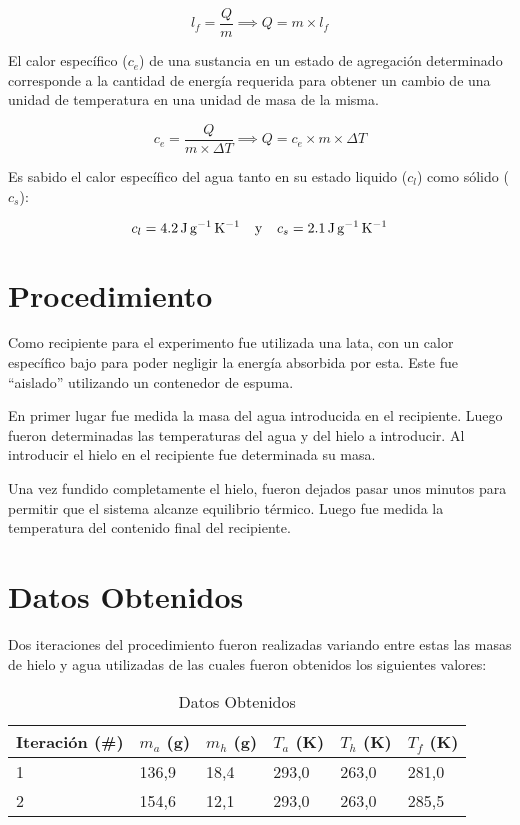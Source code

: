 \documentclass{article}
\begin{document}
\begin{equation}
    \label{lf}
    l_f=\frac{Q}{m}\implies Q=m\times l_f
\end{equation}

El calor específico ($c_e$) de una sustancia en un estado de agregación determinado corresponde a la cantidad de energía requerida para obtener un cambio de una unidad de temperatura en una unidad de masa de la misma.

\begin{equation}
    \label{ce}
    c_e=\frac{Q}{m\times\varDelta T} \implies Q=c_e\times m\times\varDelta T
\end{equation}

Es sabido el calor específico del agua tanto en su estado liquido ($c_l$) como sólido ($c_s$):

\begin{equation*}
    c_l=\text{\SI{4,2}{\joule\per\gram\per\kelvin}}\text{\hphantom{lol}y\hphantom{lol}}c_s=\text{\SI{2,1}{\joule\per\gram\per\kelvin}}
\end{equation*}

\section{Procedimiento}

Como recipiente para el experimento fue utilizada una lata, con un calor específico bajo para poder negligir la energía absorbida por esta. Este fue ``aislado'' utilizando un contenedor de espuma.

En primer lugar fue medida la masa del agua introducida en el recipiente. Luego fueron determinadas las temperaturas del agua y del hielo a introducir. Al introducir el hielo en el recipiente fue determinada su masa.

Una vez fundido completamente el hielo, fueron dejados pasar unos minutos para permitir que el sistema alcanze equilibrio térmico. Luego fue medida la temperatura del contenido final del recipiente.

\section{Datos Obtenidos}

Dos iteraciones del procedimiento fueron realizadas variando entre estas las masas de hielo y agua utilizadas de las cuales fueron obtenidos los siguientes valores:

\begin{table}[H]
    \centering
    \begin{tabular}{|l|l|l|l|l|l|}
        \hline
        \rowcolor[HTML]{C0C0C0} 
        Iteración (\#) & $m_a$ (g) & $m_h$ (g) & $T_a$ (K) & $T_h$ (K) & $T_f$ (K) \\ \hline
        1         &  136,9  &  18,4  &  293,0  &  263,0  &  281,0  \\ \hline
        2         &  154,6  &  12,1  &  293,0  &  263,0  &  285,5  \\ \hline
    \end{tabular}
    \caption{Datos Obtenidos}
    \label{table:mediciones}
\end{table}
\end{document}
